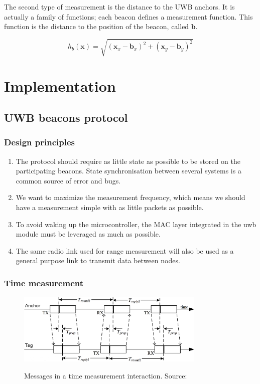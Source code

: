 \documentclass[a4paper]{scrreprt}
\begin{document}
The second type of measurement is the distance to the UWB anchors.
It is actually a family of functions; each beacon defines a measurement function.
This function is the distance to the position of the beacon, called $\mathbf{b}$.

\begin{equation}
    h_b(\mathbf{x}) = \sqrt{\left(\mathbf{x}_x - \mathbf{b}_x\right)^2 + \left(\mathbf{x}_y - \mathbf{b}_y\right)^2}
\end{equation}

\chapter{Implementation}

\section{UWB beacons protocol}

\subsection{Design principles}

\begin{enumerate}
    \item The protocol should require as little state as possible to be stored on the participating beacons.
        State synchronisation between several systems is a common source of error and bugs.
    \item We want to maximize the measurement frequency, which means we should have a measurement simple with as little packets as possible.
    \item To avoid waking up the microcontroller, the MAC layer integrated in the \gls{uwb} module must be leveraged as much as possible.
    \item The same radio link used for range measurement will also be used as a general purpose link to transmit data between nodes.
\end{enumerate}

\subsection{Time measurement}

\begin{figure}[h]
    \centering
    \includegraphics[width=0.8\textwidth]{figures/ranging_protocol.png}
    \label{fig:ranging_protocol}
    \caption[Ranging protocol]{Messages in a time measurement interaction. Source:~\cite{dw1000manual}}
\end{figure}
\end{document}
